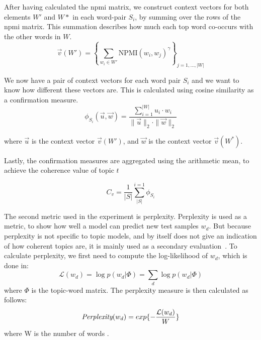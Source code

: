 After having calculated the \gls{npmi} matrix, we construct context vectors for both elements $W'$ and $W*$ in each word-pair $S_i$, by summing over the rows of the \gls{npmi} matrix.
This summation describes how much each top word co-occurs with the other words in $W$.
\begin{equation}\label{eq:coherence_1}
	\overrightarrow{v}(W') = \left\{ \sum_{w_i \in W'} \text{NPMI}(w_i, w_j)^{\gamma} \right\}_{j=1,\dots,|W|}
\end{equation}

We now have a pair of context vectors for each word pair $S_i$ and we want to know how different these vectors are.
This is calculated using cosine similarity as a confirmation measure.
\begin{equation}\label{eq:coherence_3}
	\phi_{S_i}(\overrightarrow{u}, \overrightarrow{w}) = \frac
	{\sum_{i = 1}^{|W|} u_i \cdot w_i}
	{\|\overrightarrow{u}\|_2 \cdot \|\overrightarrow{w}\|_2}
\end{equation}

\noindent where $\overrightarrow{u}$ is the context vector $\overrightarrow{v}(W')$, and $\overrightarrow{w}$ is the context vector $\overrightarrow{v}(W^*)$.

Lastly, the confirmation measures are aggregated using the arithmetic mean, to achieve the coherence value of topic $t$

\begin{equation}\label{eq:coherence_4}
	C_v = \frac{1}{|S|}\sum_{|S|}^{i=1}\phi_{S_i}
\end{equation}

The second metric used in the experiment is perplexity.
Perplexity is used as a metric, to show how well a model can predict new test samples $w_d$.
But because perplexity is not specific to topic models, and by itself does not give an indication of how coherent topics are, it is mainly used as a secondary evaluation~\cite{tea_leaves}.
To calculate perplexity, we first need to compute the log-likelihood of $w_d$, which is done in:
\begin{equation}\label{eq:likelihood}
	\mathcal{L}(w_d) = \log p(w_d|\Phi) = \sum_{d} \log p(w_d|\Phi)
\end{equation}
\noindent where $\Phi$ is the topic-word matrix.
The perplexity measure is then calculated as follows:
\begin{equation}
	\emph{Perplexity}(w_d) = exp \{-\frac{\mathcal{L}(w_d)}{W}\}
\end{equation}
\noindent where W is the number of words \cite{de2008evaluating}.

